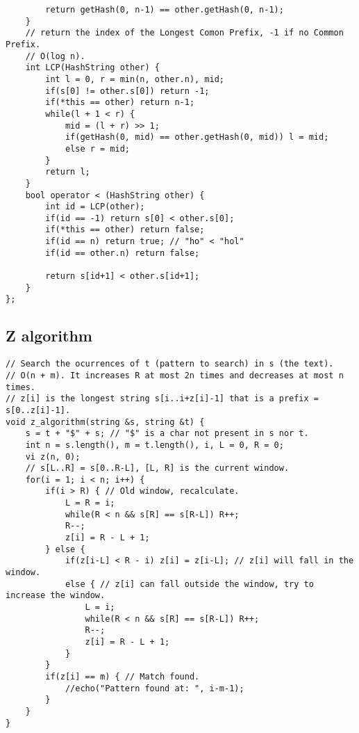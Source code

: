 \documentclass[a4paper]{article}
\begin{document}
\begin{multicols}{2}
\begin{verbatim}
        return getHash(0, n-1) == other.getHash(0, n-1);
    }
    // return the index of the Longest Comon Prefix, -1 if no Common Prefix.
    // O(log n).
    int LCP(HashString other) {
        int l = 0, r = min(n, other.n), mid;
        if(s[0] != other.s[0]) return -1;
        if(*this == other) return n-1;
        while(l + 1 < r) {
            mid = (l + r) >> 1;
            if(getHash(0, mid) == other.getHash(0, mid)) l = mid;
            else r = mid;
        }
        return l;
    }
    bool operator < (HashString other) {
        int id = LCP(other);
        if(id == -1) return s[0] < other.s[0];
        if(*this == other) return false;
        if(id == n) return true; // "ho" < "hol"
        if(id == other.n) return false;

        return s[id+1] < other.s[id+1];
    }
};
\end{verbatim}
\end{multicols}
\subsection*{Z algorithm}
\begin{verbatim}
// Search the ocurrences of t (pattern to search) in s (the text).
// O(n + m). It increases R at most 2n times and decreases at most n times. 
// z[i] is the longest string s[i..i+z[i]-1] that is a prefix = s[0..z[i]-1].
void z_algorithm(string &s, string &t) {
    s = t + "$" + s; // "$" is a char not present in s nor t.
    int n = s.length(), m = t.length(), i, L = 0, R = 0;
    vi z(n, 0);
    // s[L..R] = s[0..R-L], [L, R] is the current window.
    for(i = 1; i < n; i++) {
        if(i > R) { // Old window, recalculate.
            L = R = i;
            while(R < n && s[R] == s[R-L]) R++;
            R--;
            z[i] = R - L + 1;
        } else {
            if(z[i-L] < R - i) z[i] = z[i-L]; // z[i] will fall in the window.
            else { // z[i] can fall outside the window, try to increase the window.
                L = i;
                while(R < n && s[R] == s[R-L]) R++;
                R--;
                z[i] = R - L + 1;
            }
        }
        if(z[i] == m) { // Match found.
            //echo("Pattern found at: ", i-m-1);
        }
    }
}
\end{verbatim}
\end{document}
